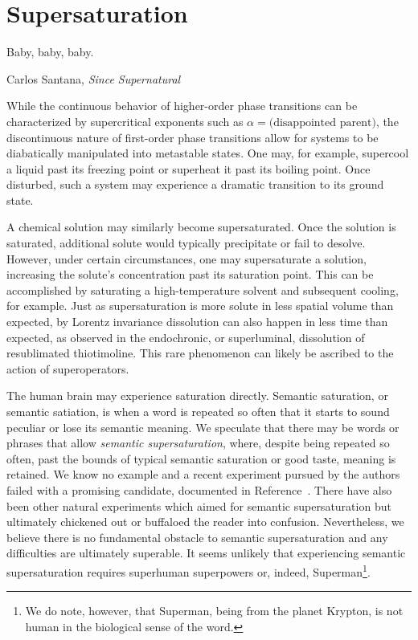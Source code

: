 \section{Supersaturation}

\epigraph{Baby, baby, baby.
}{Carlos Santana, \textit{Since Supernatural}}

While the continuous behavior of higher-order phase transitions can be characterized by supercritical exponents such as $\alpha=\text{(disappointed parent)}$, the discontinuous nature of first-order phase transitions allow for systems to be diabatically manipulated into metastable states.
One may, for example, supercool a liquid past its freezing point or superheat it past its boiling point.
Once disturbed, such a system may experience a dramatic transition to its ground state.


A chemical solution may similarly become supersaturated.
Once the solution is saturated, additional solute would typically precipitate or fail to desolve.
However, under certain circumstances, one may supersaturate a solution, increasing the solute's concentration past its saturation point.
This can be accomplished by saturating a high-temperature solvent and subsequent cooling, for example.
Just as supersaturation is more solute in less spatial volume than expected, by Lorentz invariance dissolution can also happen in less time than expected, as observed in the endochronic, or superluminal, dissolution of resublimated thiotimoline\cite{asimov:1948,asimov:1953,asimov:1960,vernon:2022}.
This rare phenomenon can likely be ascribed to the action of superoperators\cite{Deutsch:1991nm}.

The human brain may experience saturation directly.
Semantic saturation, or semantic satiation, is when a word is repeated so often that it starts to sound peculiar or lose its semantic meaning.
We speculate that there may be words or phrases that allow \emph{semantic supersaturation}, where, despite being repeated so often, past the bounds of typical semantic saturation or good taste, meaning is retained.
We know no example and a recent experiment pursued by the authors failed with a promising candidate, documented in Reference~\cite{self}.
There have also been other natural experiments which aimed for semantic supersaturation but ultimately chickened out\cite{chicken} or buffaloed the reader into confusion\cite{buffalo}.
Nevertheless, we believe there is no fundamental obstacle to semantic supersaturation and any difficulties are ultimately superable.
It seems unlikely that experiencing semantic supersaturation requires superhuman superpowers or, indeed, Superman\footnote{We do note, however, that Superman, being from the planet Krypton, is not human in the biological sense of the word.}\cite{tippett:2009}.
